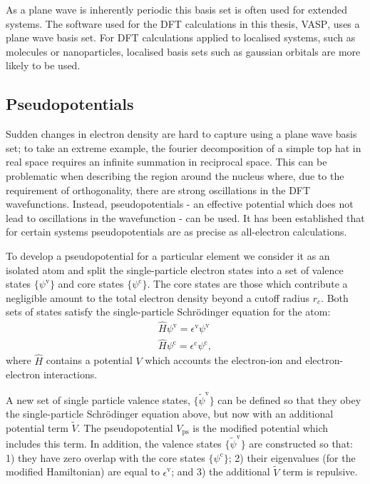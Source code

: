 As a plane wave is inherently periodic this basis set is often used for extended systems. The software used for the DFT calculations in this thesis, \textsc{VASP},\autocite{Kresse1996} uses a plane wave basis set. For DFT calculations applied to localised systems, such as molecules or nanoparticles, localised basis sets such as gaussian orbitals are more likely to be used.

\subsection{Pseudopotentials}

Sudden changes in electron density are hard to capture using a plane wave basis set; to take an extreme example, the fourier decomposition of a simple top hat in real space requires an infinite summation in reciprocal space. This can be problematic when describing the region around the nucleus where, due to the requirement of orthogonality, there are strong oscillations in the DFT wavefunctions. Instead, pseudopotentials - an effective potential which does not lead to oscillations in the wavefunction - can be used. It has been established that for certain systems pseudopotentials are as precise as all-electron calculations.\autocite{Lejaeghere2016}

To develop a pseudopotential for a particular element we consider it as an isolated atom and split the single-particle electron states into a set of valence states $\{\psi^\mathrm{v}\}$ and core states $\{\psi^\mathrm{c}\}$.\autocite{Kaxiras2007} The core states are those which contribute a negligible amount to the total electron density beyond a cutoff radius $r_c$. Both sets of states satisfy the single-particle Schr\"{o}dinger equation for the atom:
\begin{align} \label{speqn}
\hat{H}\psi^\mathrm{v} = \epsilon^\mathrm{v}\psi^\mathrm{v} \\
\hat{H}\psi^\mathrm{c} = \epsilon^\mathrm{c}\psi^\mathrm{c},
\end{align}
where $\hat{H}$ contains a potential $V$ which accounts the electron-ion and electron-electron interactions.

A new set of single particle valence states, $\{\tilde{\psi}^\mathrm{v}\}$ can be defined so that they obey the single-particle Schr\"{o}dinger equation above, but now with an additional potential term $\tilde{V}$. 
The pseudopotential $V_\mathrm{ps}$ is the modified potential which includes this term.
In addition, the valence states $\{\tilde{\psi}^\mathrm{v}\}$ are constructed so that: 1) they have zero overlap with the core states $\{\psi^\mathrm{c}\}$; 2) their eigenvalues (for the modified Hamiltonian) are equal to $\epsilon^\mathrm{v}$; and 3) the additional $\tilde{V}$ term is repulsive.

